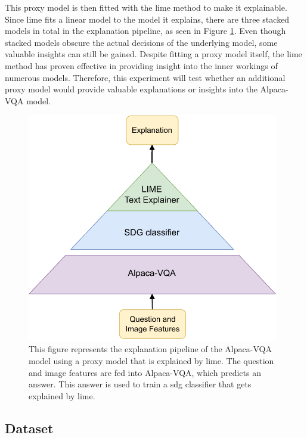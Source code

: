        This proxy model is then fitted with the \gls{lime} method to make it explainable. Since \gls{lime} fits a linear model to the model it explains, there are three stacked models in total in the explanation pipeline, as seen in Figure \ref{fig:LIMEpyramide}. 
        Even though stacked models obscure the actual decisions of the underlying model, some valuable insights can still be gained. 
        Despite fitting a proxy model itself, the \gls{lime} method has proven effective in providing insight into the inner workings of numerous models. Therefore, this experiment will test whether an additional proxy model would provide valuable explanations or insights into the Alpaca-VQA model. 
         

        \begin{figure}[htb]
            \centering
            \centerline{
            \includegraphics[width=11cm]
            {images/LIMEpyramide}}
            \caption[Figure of the explanation pipeline for Alpaca-VQA.]{This figure represents the explanation pipeline of the Alpaca-VQA model using a proxy model that is explained by \gls{lime}. The question and image features are fed into Alpaca-VQA, which predicts an answer. This answer is used to train a \gls{sdg} classifier that gets explained by \gls{lime}.}
            \label{fig:LIMEpyramide}
        \end{figure}


        
        
        

    \subsection{Dataset}
        
